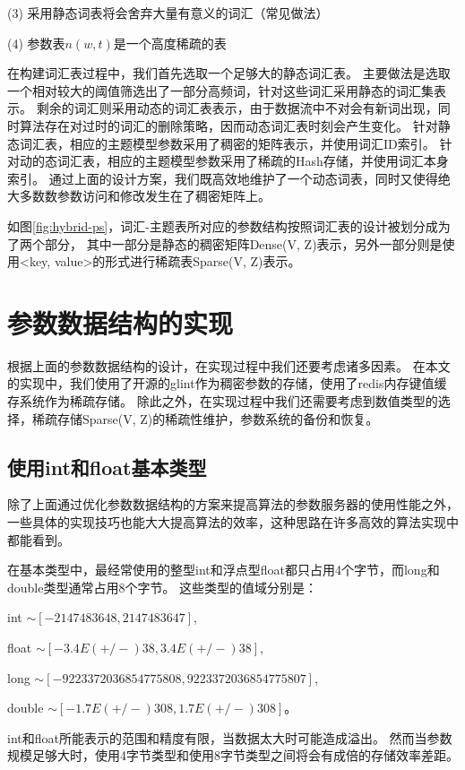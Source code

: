 (3) 采用静态词表将会舍弃大量有意义的词汇（常见做法）

(4) 参数表$n(w,t)$是一个高度稀疏的表


在构建词汇表过程中，我们首先选取一个足够大的静态词汇表。
主要做法是选取一个相对较大的阈值筛选出了一部分高频词，针对这些词汇采用静态的词汇集表示。
剩余的词汇则采用动态的词汇表表示，由于数据流中不对会有新词出现，同时算法存在对过时的词汇的删除策略，因而动态词汇表时刻会产生变化。
针对静态词汇表，相应的主题模型参数采用了稠密的矩阵表示，并使用词汇ID索引。
针对动的态词汇表，相应的主题模型参数采用了稀疏的Hash存储，并使用词汇本身索引。
通过上面的设计方案，我们既高效地维护了一个动态词表，同时又使得绝大多数数参数访问和修改发生在了稠密矩阵上。

如图\ref{fig:hybrid-ps}，词汇-主题表所对应的参数结构按照词汇表的设计被划分成为了两个部分，
其中一部分是静态的稠密矩阵Dense(V, Z)表示，另外一部分则是使用<key, value>的形式进行稀疏表Sparse(V, Z)表示。

\section{参数数据结构的实现}
根据上面的参数数据结构的设计，在实现过程中我们还要考虑诸多因素。
在本文的实现中，我们使用了开源的glint\cite{glint}作为稠密参数的存储，使用了redis\cite{redis}内存键值缓存系统作为稀疏存储。
除此之外，在实现过程中我们还需要考虑到数值类型的选择，稀疏存储Sparse(V, Z)的稀疏性维护，参数系统的备份和恢复。

\subsection{使用int和float基本类型}
除了上面通过优化参数数据结构的方案来提高算法的参数服务器的使用性能之外，
一些具体的实现技巧也能大大提高算法的效率，这种思路在许多高效的算法实现中都能看到。

在基本类型中，最经常使用的整型int和浮点型float都只占用4个字节，而long和double类型通常占用8个字节。
这些类型的值域分别是：

int $\sim [-2147483648, 2147483647]$,

float $\sim [-3.4E(+/-)38, 3.4E(+/-)38]$, 

long $\sim [-9223372036854775808, 9223372036854775807]$,
	 
double $\sim [-1.7E(+/-)308, 1.7E(+/-)308]$。

int和float所能表示的范围和精度有限，当数据太大时可能造成溢出。
然而当参数规模足够大时，使用4字节类型和使用8字节类型之间将会有成倍的存储效率差距。

